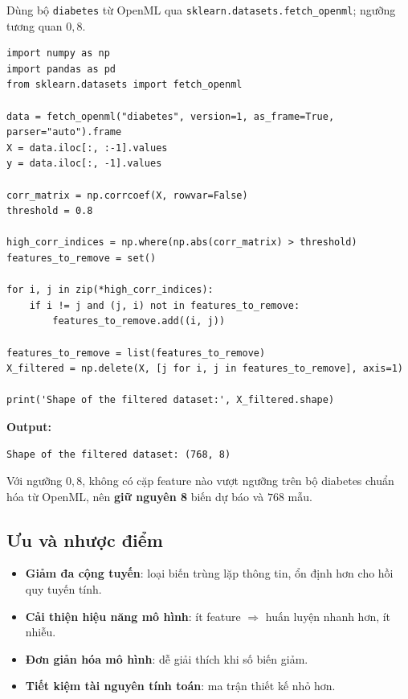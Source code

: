 \begin{dongco}[title={Dữ liệu}]
Dùng bộ \texttt{diabetes} từ OpenML qua \texttt{sklearn.datasets.fetch\_openml}; ngưỡng tương quan $0{,}8$.
\end{dongco}

\begin{vidu}[title={Mã đầy đủ}]
\begin{lstlisting}
import numpy as np
import pandas as pd
from sklearn.datasets import fetch_openml

data = fetch_openml("diabetes", version=1, as_frame=True, parser="auto").frame
X = data.iloc[:, :-1].values
y = data.iloc[:, -1].values

corr_matrix = np.corrcoef(X, rowvar=False)
threshold = 0.8

high_corr_indices = np.where(np.abs(corr_matrix) > threshold)
features_to_remove = set()

for i, j in zip(*high_corr_indices):
    if i != j and (j, i) not in features_to_remove:
        features_to_remove.add((i, j))

features_to_remove = list(features_to_remove)
X_filtered = np.delete(X, [j for i, j in features_to_remove], axis=1)

print('Shape of the filtered dataset:', X_filtered.shape)
\end{lstlisting}
\end{vidu}

\begin{ynghia}[title={Kết quả đầu ra}]
\textbf{Output:}
\begin{lstlisting}
Shape of the filtered dataset: (768, 8)
\end{lstlisting}
Với ngưỡng $0{,}8$, không có cặp feature nào vượt ngưỡng trên bộ diabetes chuẩn hóa từ OpenML, nên \textbf{giữ nguyên 8} biến dự báo và $768$ mẫu.
\end{ynghia}

\subsection{Ưu và nhược điểm}

\begin{tinhchat}[title={Ưu điểm}]
\begin{itemize}
  \item \textbf{Giảm đa cộng tuyến}: loại biến trùng lặp thông tin, ổn định hơn cho hồi quy tuyến tính.
  \item \textbf{Cải thiện hiệu năng mô hình}: ít feature $\Rightarrow$ huấn luyện nhanh hơn, ít nhiễu.
  \item \textbf{Đơn giản hóa mô hình}: dễ giải thích khi số biến giảm.
  \item \textbf{Tiết kiệm tài nguyên tính toán}: ma trận thiết kế nhỏ hơn.
\end{itemize}
\end{tinhchat}

